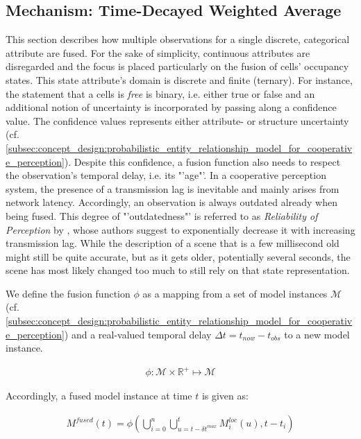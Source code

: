 \subsection{Mechanism: Time-Decayed Weighted Average}
\label{subsec:concept_design:fusion_mechanism}
This section describes how multiple observations for a single discrete, categorical attribute are fused. For the sake of simplicity, continuous attributes are disregarded and the focus is placed particularly on the fusion of cells' occupancy states. This state attribute's domain is discrete and finite (ternary). For instance, the statement that a cells is \textit{free} is binary, i.e. either true or false and an additional notion of uncertainty is incorporated by passing along a confidence value. The confidence values represents either attribute- or structure uncertainty (cf. \cref{subsec:concept_design:probabilistic_entity_relationship_model_for_cooperative_perception}).
Despite this confidence, a fusion function also needs to respect the observation's temporal delay, i.e. its "'age"'. In a cooperative perception system, the presence of a transmission lag is inevitable and mainly arises from network latency. Accordingly, an observation is always outdated already when being fused. This degree of "'outdatedness"' is referred to as \textit{Reliability of Perception} by \cite{liu2013motion}, whose authors suggest to exponentially decrease it with increasing transmission lag. While the description of a scene that is a few millisecond old might still be quite accurate, but as it gets older, potentially several seconds, the scene has most likely changed too much to still rely on that state representation. 

We define the fusion function $\phi$ as a mapping from a set of model instances $\mathcal{M}$ (cf. \cref{subsec:concept_design:probabilistic_entity_relationship_model_for_cooperative_perception}) and a real-valued temporal delay $\Delta t = t_{now} - t_{obs}$ to a new model instance.

\begin{gather}
	\phi: \mathcal{M} \times \mathbb{R}^+ \mapsto \mathcal{M}
\end{gather}

Accordingly, a fused model instance at time $t$ is given as:

\begin{gather}
	M^{fused}(t) = \phi(\bigcup^n_{i = 0} \bigcup^t_{u = t - \delta t^{max}} M^{loc}_i(u), t-t_i)
\end{gather}

